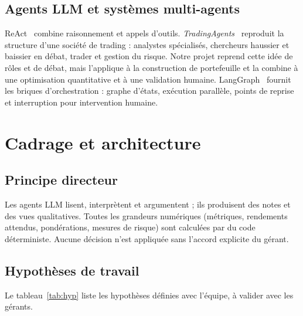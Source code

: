 \documentclass[11pt,a4paper]{report}
\begin{document}
\section{Agents LLM et systèmes multi-agents}
ReAct~\cite{react} combine raisonnement et appels d'outils. \emph{TradingAgents}~\cite{tradingagents}
reproduit la structure d'une société de trading : analystes spécialisés, chercheurs haussier et baissier en débat,
trader et gestion du risque. Notre projet reprend cette idée de rôles et de débat, mais l'applique à la construction
de portefeuille et la combine à une optimisation quantitative et à une validation humaine.
LangGraph~\cite{langgraph} fournit les briques d'orchestration : graphe d'états, exécution parallèle,
points de reprise et interruption pour intervention humaine.

\chapter{Cadrage et architecture}\label{ch:archi}

\section{Principe directeur}
\begin{retenir}
Les agents LLM lisent, interprètent et argumentent ; ils produisent des notes et des vues qualitatives.
Toutes les grandeurs numériques (métriques, rendements attendus, pondérations, mesures de risque) sont calculées
par du code déterministe. Aucune décision n'est appliquée sans l'accord explicite du gérant.
\end{retenir}

\section{Hypothèses de travail}
Le tableau~\ref{tab:hyp} liste les hypothèses définies avec l'équipe, à valider avec les gérants.
\end{document}
